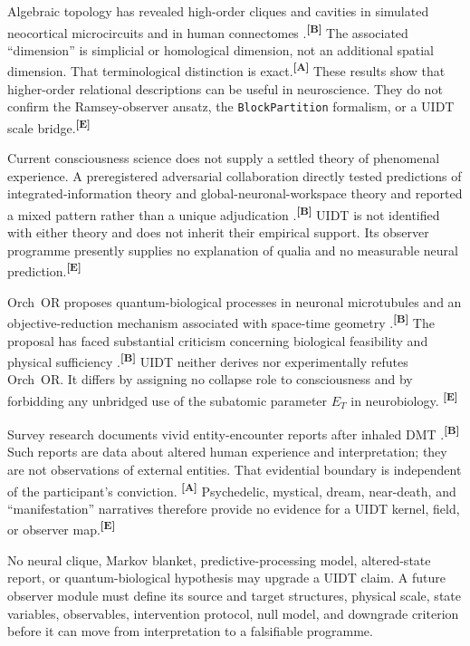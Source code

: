 \documentclass[12pt,a4paper,twoside]{article}
\theoremstyle{plain}
\theoremstyle{definition}
\theoremstyle{remark}
\newcommand{\catmark}[1]{\textsuperscript{\textsf{\textbf{[#1]}}}}
\begin{document}
Algebraic topology has revealed high-order cliques and cavities in simulated
neocortical microcircuits and in human connectomes
\cite{reimann2017,sizemore2018}.\catmark{B} The associated ``dimension'' is
simplicial or homological dimension, not an additional spatial dimension. That
terminological distinction is exact.\catmark{A} These results show that
higher-order relational descriptions can be useful in neuroscience. They do
not confirm the Ramsey-observer ansatz, the \texttt{BlockPartition} formalism,
or a UIDT scale bridge.\catmark{E}

Current consciousness science does not supply a settled theory of phenomenal
experience. A preregistered adversarial collaboration directly tested
predictions of integrated-information theory and global-neuronal-workspace
theory and reported a mixed pattern rather than a unique adjudication
\cite{cogitate2025}.\catmark{B} UIDT is not identified with either theory and
does not inherit their empirical support. Its observer programme presently
supplies no explanation of qualia and no measurable neural prediction.\catmark{E}

Orch~OR proposes quantum-biological processes in neuronal microtubules and an
objective-reduction mechanism associated with space-time geometry
\cite{hameroff2014}.\catmark{B} The proposal has faced substantial criticism
concerning biological feasibility and physical sufficiency
\cite{reimers2014}.\catmark{B} UIDT neither derives nor experimentally refutes
Orch~OR. It differs by assigning no collapse role to consciousness and by
forbidding any unbridged use of the subatomic parameter $E_T$ in neurobiology.
\catmark{E}

Survey research documents vivid entity-encounter reports after inhaled DMT
\cite{davis2020}.\catmark{B} Such reports are data about altered human
experience and interpretation; they are not observations of external entities.
That evidential boundary is independent of the participant's conviction.
\catmark{A} Psychedelic, mystical, dream, near-death, and ``manifestation''
narratives therefore provide no evidence for a UIDT kernel, field, or observer
map.\catmark{E}

\begin{governancebox}
No neural clique, Markov blanket, predictive-processing model, altered-state
report, or quantum-biological hypothesis may upgrade a UIDT claim. A future
observer module must define its source and target structures, physical scale,
state variables, observables, intervention protocol, null model, and downgrade
criterion before it can move from interpretation to a falsifiable programme.
\end{governancebox}
\end{document}

